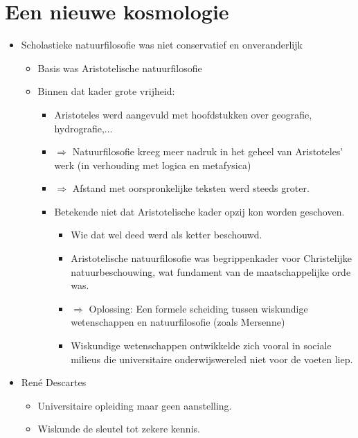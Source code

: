 \documentclass{article}
\begin{document}
  \section{Een nieuwe kosmologie}
    \begin{itemize}
      \item Scholastieke natuurfilosofie was niet conservatief en onveranderlijk
      \begin{itemize}
        \item Basis was Aristotelische natuurfilosofie
        \item Binnen dat kader grote vrijheid:
        \begin{itemize}
          \item Aristoteles werd aangevuld met hoofdstukken over geografie, hydrografie,...
          \item $\Rightarrow$ Natuurfilosofie kreeg meer nadruk in het geheel van Aristoteles' werk (in verhouding met logica en metafysica)
          \item $\Rightarrow$ Afstand met oorspronkelijke teksten werd steeds groter.
          \item Betekende niet dat Aristotelische kader opzij kon worden geschoven.
          \begin{itemize}
            \item Wie dat wel deed werd als ketter beschouwd.
            \item Aristotelische natuurfilosofie was begrippenkader voor Christelijke natuurbeschouwing, wat fundament van de maatschappelijke orde was.
            \item $\Rightarrow$ Oplossing: Een formele scheiding tussen wiskundige wetenschappen en natuurfilosofie (zoals Mersenne)
              \item Wiskundige wetenschappen ontwikkelde zich vooral in sociale milieus die universitaire onderwijswereled niet voor de voeten liep.
          \end{itemize}
        \end{itemize}
      \end{itemize}
      \item Ren\'e Descartes
      \begin{itemize}
        \item Universitaire opleiding maar geen aanstelling.
        \item Wiskunde de sleutel tot zekere kennis.

\end{itemize}
\end{itemize}
\end{document}
